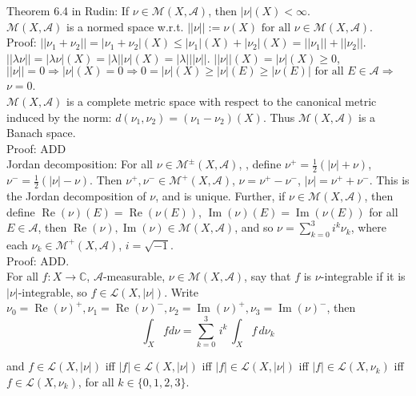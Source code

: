 \documentclass[12pt]{article}
\newcommand{\fall}[0] { \textrm{ for all } }
\newcommand{\rimply}[0] { \Rightarrow }
\newcommand{\rarw}[0] { \rightarrow }
\renewcommand{\Re}{ \operatorname{Re} }
\renewcommand{\Im}{ \operatorname{Im} }
\newcommand{\complexes}[0] { \mathbb{C}}
\newcommand{\A}[0] { \mathcal{A} }
\newcommand{\M}[0] { \mathcal{M} }
\newcommand{\Ell}[0] { \mathcal{L} }
\begin{document}
Theorem 6.4 in Rudin: If $\nu \in \M(X, \A)$, then $|\nu|(X) < \infty$. \\

$\M(X, \A)$ is a normed space w.r.t. $||\nu|| := \nu(X) \fall \nu \in \M(X, \A)$. \\

\noindent
Proof: $|| \nu_1 + \nu_2 || = |\nu_1 + \nu_2|(X) \le |\nu_1|(X) + |\nu_2|(X) = ||\nu_1|| + ||\nu_2|| $. $||\lambda \nu|| = |\lambda \nu|(X) = |\lambda| |\nu|(X) = |\lambda| ||\nu||$. $||\nu||(X) = |\nu|(X) \ge 0$, $||\nu|| = 0 \rimply |\nu|(X) = 0 \rimply 0 = |\nu|(X) \ge |\nu|(E) \ge |\nu(E)| \fall E \in \A \rimply$ $\nu = 0$. \\

$\M(X, \A)$ is a complete metric space with respect to the canonical metric induced by the norm: $d(\nu_1,\nu_2) = (\nu_1-\nu_2)(X)$. Thus $\M(X, \A)$ is a Banach space. \\

\noindent
Proof: ADD \\

Jordan decomposition: For all $ \nu \in \M^\pm(X, \A)$, , define $\nu^+ = \frac{1}{2}(|\nu| + \nu)$, $\nu^- = \frac{1}{2}(|\nu| - \nu)$. Then $\nu^+, \nu^- \in  \M^+(X, \A)$, $\nu = \nu^+ - \nu^-$, $|\nu| = \nu^+ + \nu^-$. This is the Jordan decomposition of $\nu$, and is unique. Further, if $\nu \in \M(X, \A)$, then define $\Re(\nu)(E) = \Re(\nu(E))$, $\Im(\nu)(E) = \Im(\nu(E))$ for all $E \in \A$, then $\Re(\nu), \Im(\nu) \in \M(X, \A)$, and so $\nu = \sum_{k=0}^3 i^k \nu_k$, where each $\nu_k \in \M^+(X, \A)$, $i = \sqrt{-1}$.\\

\noindent
Proof: ADD. \\


For all $f:X \rarw \complexes$, $\A$-measurable, $\nu \in \M(X, \A)$, say that $f$ is $\nu$-integrable if it is $|\nu|$-integrable, so $f \in \Ell (X, |\nu|)$. Write $\nu_0 = \Re(\nu)^+, \nu_1 = \Re(\nu)^-, \nu_2 = \Im(\nu)^+, \nu_3 = \Im(\nu)^-$, then \\

$$
\int_X f d\nu = \sum_{k=0}^3 \, i^k \, \int_X f \, d\nu_k
$$

\noindent
and $f \in \Ell (X, |\nu|)$ iff $|f| \in \Ell (X, |\nu|)$ iff $|f| \in \Ell (X, |\nu|)$ iff $|f| \in \Ell (X, \nu_k)$ iff $f \in \Ell (X, \nu_k)$, for all $k \in \{0,1,2,3\}$. \\
\end{document}
